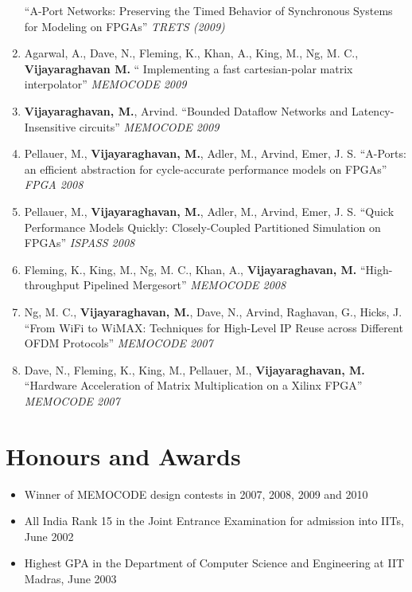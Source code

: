 \documentclass[margin]{resume}
\begin{document}
\begin{resume}
\begin{enumerate}
    ``A-Port Networks: Preserving the Timed Behavior of Synchronous Systems for
    Modeling on FPGAs'' \textit{TRETS (2009)}
    \item Agarwal, A., Dave, N., Fleming, K., Khan, A., King, M., Ng, M. C., \textbf{Vijayaraghavan M.} ``
    Implementing a fast cartesian-polar matrix interpolator'' \textit{MEMOCODE 2009}
    \item \textbf{Vijayaraghavan, M.}, Arvind. ``Bounded Dataflow Networks and
    Latency-Insensitive circuits'' \textit{MEMOCODE 2009}
    \item Pellauer, M.,
    \textbf{Vijayaraghavan, M.}, Adler, M., Arvind, Emer, J. S. ``A-Ports: an
    efficient abstraction for cycle-accurate performance models on FPGAs''
    \textit{FPGA 2008}
    \item Pellauer, M., \textbf{Vijayaraghavan, M.}, Adler, M., Arvind, Emer,
    J. S. ``Quick Performance Models Quickly: Closely-Coupled Partitioned
    Simulation on FPGAs'' \textit{ISPASS 2008}
    \item Fleming, K., King, M., Ng, M. C., Khan, A., \textbf{Vijayaraghavan, M.} ``High-throughput Pipelined Mergesort'' \textit{MEMOCODE 2008}
    \item Ng, M. C., \textbf{Vijayaraghavan, M.}, Dave, N., Arvind, Raghavan, G., Hicks, J. ``From WiFi to WiMAX: Techniques for High-Level IP Reuse across Different OFDM Protocols'' \textit{MEMOCODE 2007}
    \item Dave, N., Fleming, K., King, M., Pellauer, M., \textbf{Vijayaraghavan, M.} ``Hardware Acceleration of Matrix Multiplication on a Xilinx FPGA'' \textit{MEMOCODE 2007}
    \end{enumerate}

    \section{\mysidestyle Honours and Awards} 

	\begin{itemize}
  \item Winner of MEMOCODE design contests in 2007, 2008, 2009 and 2010
  \item All India Rank 15 in the Joint Entrance Examination for admission into IITs, June 2002
  \item Highest GPA in the Department of Computer Science and Engineering at IIT Madras, June 2003
  \end{itemize}


\end{resume}
\end{document}
